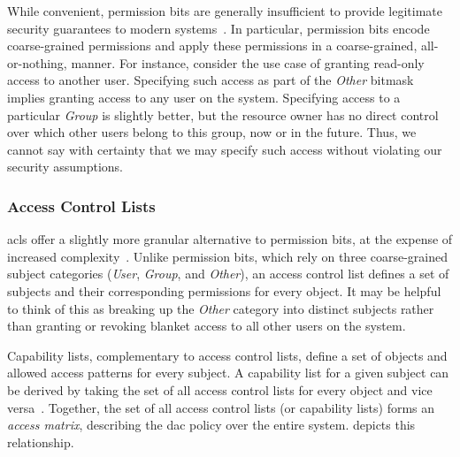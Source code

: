 While convenient, permission bits are generally insufficient to provide legitimate
security guarantees to modern systems~\cite{van_oorschot2020_tools_jewels,
jaeger2008_os_security}. In particular, permission bits encode coarse-grained permissions
and apply these permissions in a coarse-grained, all-or-nothing, manner. For instance,
consider the use case of granting read-only access to another user. Specifying such access
as part of the \textit{Other} bitmask implies granting access to any user on the system.
Specifying access to a particular \textit{Group} is slightly better, but the resource
owner has no direct control over which other users belong to this group, now or in the
future. Thus, we cannot say with certainty that we may specify such access without
violating our security assumptions.

\subsubsection*{Access Control Lists}

\Glspl{acl} offer a slightly more granular alternative to permission bits,
at the expense of increased complexity~\cite{jaeger2008_os_security,
van_oorschot2020_tools_jewels}. Unlike permission bits, which rely on three coarse-grained
subject categories (\textit{User}, \textit{Group}, and \textit{Other}), an access control
list defines a set of subjects and their corresponding permissions for every object. It
may be helpful to think of this as breaking up the \textit{Other} category into distinct
subjects rather than granting or revoking blanket access to all other users on the system.

Capability lists, complementary to access control lists, define a set of objects and
allowed access patterns for every subject. A capability list for a given subject can be
derived by taking the set of all access control lists for every object and vice
versa~\cite{van_oorschot2020_tools_jewels}. Together, the set of all access control lists
(or capability lists) forms an \textit{access matrix}, describing the \gls{dac} policy over
the entire system.  depicts this relationship.

